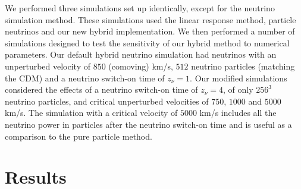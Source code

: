 \documentclass[useAMS, usenatbib]{mnras}
\begin{document}
We performed three simulations set up identically, except for the neutrino simulation method. These simulations used the linear response method, particle neutrinos and our new hybrid implementation. We then performed a number of simulations designed to test the sensitivity of our hybrid method to numerical parameters. Our default hybrid neutrino simulation had neutrinos with an unperturbed velocity of $850$ (comoving) km/s, $512$ neutrino particles (matching the CDM) and a neutrino switch-on time of $z_\nu = 1$. Our modified simulations considered the effects of a neutrino switch-on time of $z_\nu = 4$, of only $256^3$ neutrino particles, and critical unperturbed velocities of $750$, $1000$ and $5000$ km/s. The simulation with a critical velocity of $5000$ km/s includes all the neutrino power in particles after the neutrino switch-on time and is useful as a comparison to the pure particle method.

\section{Results}
\label{sec:results}
\end{document}
